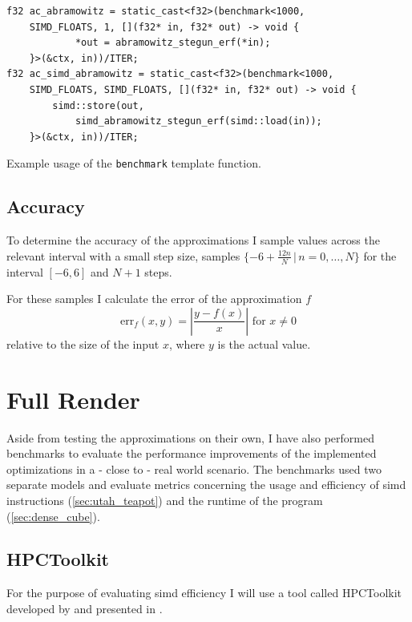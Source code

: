 \documentclass[a4paper, 11pt]{memoir}
\begin{document}
    \begin{listing}[t]
        \begin{verbatim}
f32 ac_abramowitz = static_cast<f32>(benchmark<1000,
    SIMD_FLOATS, 1, [](f32* in, f32* out) -> void {
            *out = abramowitz_stegun_erf(*in);
    }>(&ctx, in))/ITER;
f32 ac_simd_abramowitz = static_cast<f32>(benchmark<1000,
    SIMD_FLOATS, SIMD_FLOATS, [](f32* in, f32* out) -> void {
        simd::store(out,
            simd_abramowitz_stegun_erf(simd::load(in));
    }>(&ctx, in))/ITER;
        \end{verbatim}
        \caption{Example usage of the \texttt{benchmark} template function.}
        \label{lst:benchmark_example}
    \end{listing}

    \subsection{Accuracy}
    \label{sec:expr_accuracy}
    To determine the accuracy of the approximations I sample values across the relevant interval with a small step size,
    \eg samples $\{ -6 + \frac{12n}{N}\,|\, n=0,\dots,N \}$ for the interval $[-6, 6]$ and $N+1$ steps.

    For these samples I calculate the error of the approximation $f$
    \begin{equation}
        \text{err}_f(x, y) = \left|\frac{y - f(x)}{x}\right| \text{ for } x\ne0
    \end{equation}
    relative to the size of the input $x$, where $y$ is the actual value.

    \section{Full Render}
    \label{sec:expr_full_render}
    Aside from testing the approximations on their own, I have also performed benchmarks to evaluate the performance
    improvements of the implemented optimizations in a - close to - real world scenario. The benchmarks used two separate
    models and evaluate metrics concerning the usage and efficiency of \gls{simd} instructions (\ref{sec:utah_teapot})
    and the runtime of the program (\ref{sec:dense_cube}).

    \subsection{HPCToolkit}
    \label{sec:hpctoolkit}
    For the purpose of evaluating \gls{simd} efficiency I will use a tool called HPCToolkit developed by
    \citeauthor{hpc_toolkit} and presented in \cite{hpc_toolkit}.
\end{document}
